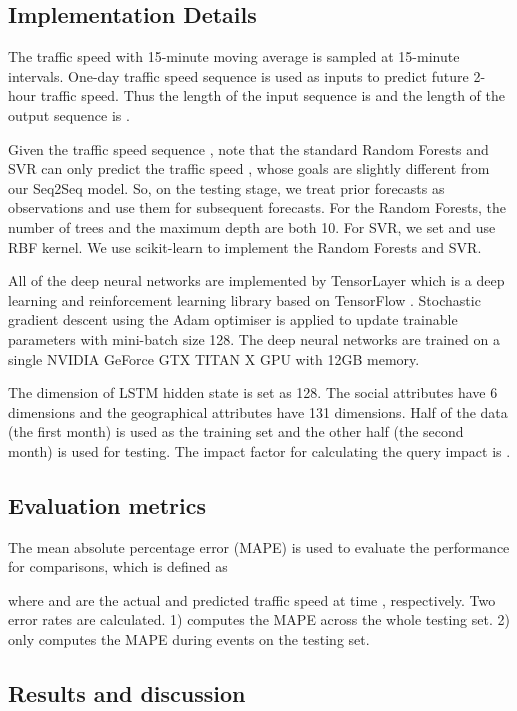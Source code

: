 \subsection{Implementation Details}
\label{details}

The traffic speed with 15-minute moving average is sampled at 15-minute intervals. One-day traffic speed sequence is used as inputs to predict future 2-hour traffic speed. Thus the length of the input sequence is  and the length of the output sequence is .

Given the traffic speed sequence , note that the standard Random Forests and SVR can only predict the traffic speed , whose goals are slightly different from our Seq2Seq model. So, on the testing stage, we treat prior forecasts as observations and use them for subsequent forecasts. For the Random Forests, the number of trees and the maximum depth are both 10. For SVR, we set  and use RBF kernel.  We use scikit-learn \cite{pedregosa2011scikit} to implement the Random Forests and SVR. 

All of the deep neural networks are implemented by TensorLayer  \cite{haoTL2017} which is a deep learning and reinforcement learning library based on TensorFlow  \cite{abadi2016tensorflow}. Stochastic gradient descent using the Adam optimiser  \cite{kingma2014adam} is applied to update trainable parameters with mini-batch size 128. The deep neural networks are trained on a single NVIDIA GeForce GTX TITAN X GPU with 12GB memory.

The dimension of LSTM hidden state is set as 128. The social attributes have 6 dimensions and the geographical attributes have 131 dimensions. Half of the data  (the first month) is used as the training set and the other half (the second month) is used for testing. The impact factor for calculating the query impact is .




\subsection{Evaluation metrics}
\label{metrics}
The mean absolute percentage error  (MAPE) is used to evaluate the performance for comparisons, which is defined as

where  and  are the actual and predicted traffic speed at time , respectively. Two error rates are calculated. 1)  computes the MAPE across the whole testing set. 2)  only computes the MAPE during events on the testing set.

\subsection{Results and discussion}
\label{results}

